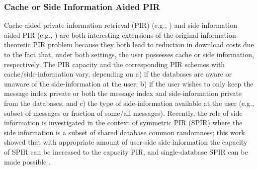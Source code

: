 \subsubsection{Cache or Side Information Aided PIR}
Cache aided private information retrieval (PIR) (e.g., \cite{tandon2017capacity, PrefetchingPIR, Cache-aided_PIR}) and side information aided PIR (e.g., \cite{heidarzadeh2018capacity, KadheRouayheb2, ZhenWangJafar, PartialPSI_PIR, StorageConstrainedPIR_Wei, shariatpanahi2018multi, HeidarzadehRouayheb, li2018single, li2020singlemult, HeidarzadehSprintson}) are both interesting extensions of the original information-theoretic PIR problem \cite{sun2017PIRcapacity} because they both lead to reduction in download costs due to the fact that, under both settings, the user possesses cache or side information, respectively. The PIR capacity and the corresponding PIR schemes with cache/side-information vary, depending on a) if the databases are aware or unaware of the side-information at the user; b) if the user wishes to only keep the message index private or both the message index and side-information private from the databases; and c) the type of side-information available at the user (e.g., subset of messages or fraction of some/all messages). Recently, the role of side information is investigated in the context of symmetric PIR (SPIR) where the side information is a subset of shared database common randomness; this work showed that with appropriate amount of user-side side information the capacity of SPIR can be increased to the capacity PIR, and single-database SPIR can be made possible \cite{SPIR_UserRandomness}.

